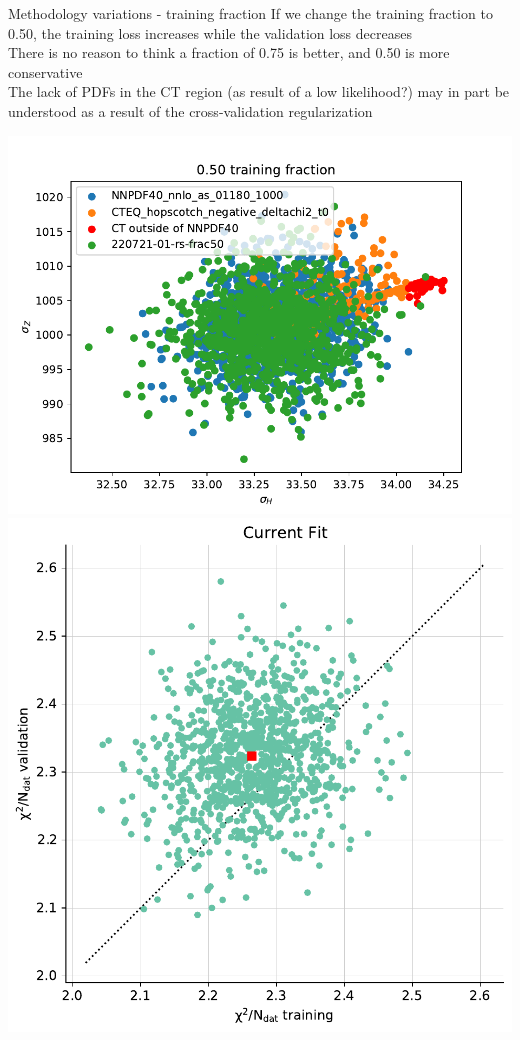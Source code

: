 \documentclass[aspectratio=169,10pt]{beamer}
\begin{document}
\begin{frame}[t]{Methodology variations - training fraction}
  If we change the training fraction to 0.50, the training loss increases while the validation loss decreases\\\vspace*{.5em}
  There is no reason to think a fraction of 0.75 is better, and 0.50 is more conservative\\\vspace*{.5em}
  The lack of PDFs in the CT region (as result of a low likelihood?) may in part be understood as a result of the cross-validation regularization
  \begin{center}
    \includegraphics[height=.5\textheight]{0.50_training_fraction.pdf}
    \includegraphics[height=.5\textheight]{frac50_training_validation.pdf}

\end{center}
\end{frame}
\end{document}
